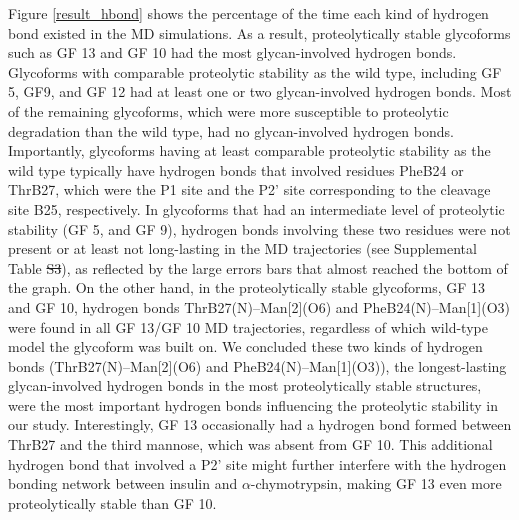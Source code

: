 \documentclass[9pt]{elife}
\providecommand{\DIFaddtex}[1]{{\protect\color{blue}\uwave{#1}}} %
\providecommand{\DIFdeltex}[1]{{\protect\color{red}\sout{#1}}}                      %
\providecommand{\DIFaddbegin}{} %
\providecommand{\DIFaddend}{} %
\providecommand{\DIFdelbegin}{} %
\providecommand{\DIFdelend}{} %
\providecommand{\DIFadd}[1]{\texorpdfstring{\DIFaddtex{#1}}{#1}} %
\providecommand{\DIFdel}[1]{\texorpdfstring{\DIFdeltex{#1}}{}} %
\begin{document}
Figure \ref{result_hbond} shows the percentage of the time each kind of hydrogen bond existed in the MD simulations. As a result, proteolytically stable glycoforms such as GF 13 and GF 10 had the most glycan-involved hydrogen bonds. Glycoforms with comparable proteolytic stability as the wild type, including GF 5, GF9, and GF 12 had at least one or two glycan-involved hydrogen bonds. Most of the remaining glycoforms, which were more susceptible to proteolytic degradation than the wild type, had no glycan-involved hydrogen bonds. Importantly, glycoforms having at least comparable proteolytic stability as the wild type typically have hydrogen bonds that involved residues PheB24 or ThrB27, which were the P1 site and the P2' site corresponding to the cleavage site B25, respectively. In glycoforms that had an intermediate level of proteolytic stability (GF 5, and GF 9), hydrogen bonds involving these two residues were not present or at least not long-lasting in the MD trajectories (see Supplemental Table \DIFdelbegin \DIFdel{S3}\DIFdelend \DIFaddbegin \DIFadd{S5}\DIFaddend ), as reflected by the large errors bars that almost reached the bottom of the graph. On the other hand, in the proteolytically stable glycoforms, GF 13 and GF 10, hydrogen bonds ThrB27(N)--Man[2](O6) and PheB24(N)--Man[1](O3) were found in all GF 13/GF 10 MD trajectories, regardless of which wild-type model the glycoform was built on. We concluded these two kinds of hydrogen bonds (ThrB27(N)--Man[2](O6) and PheB24(N)--Man[1](O3)), the longest-lasting glycan-involved hydrogen bonds in the most proteolytically stable structures, were the most important hydrogen bonds influencing the proteolytic stability in our study. Interestingly, GF 13 occasionally had a hydrogen bond formed between ThrB27 and the third mannose, which was absent from GF 10. This additional hydrogen bond that involved a P2' site might further interfere with the hydrogen bonding network between insulin and $\alpha$-chymotrypsin, making GF 13 even more proteolytically stable than GF 10. 
\end{document}
